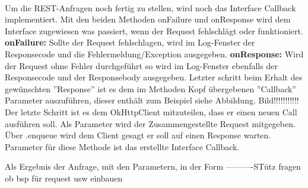 \\
Um die REST-Anfragen noch fertig zu stellen, wird noch das Interface Callback implementiert. Mit den beiden Methoden onFailure und onResponse wird dem Interface zugewiesen was passiert, wenn der Request fehlschlägt oder funktioniert. 
\\
\textbf{onFailure:}
Sollte der Request fehlschlagen, wird im Log-Fenster der Responsecode und die Fehlermeldung/Exception ausgegeben. 
\textbf{onResponse:}
Wird der Request ohne Fehler durchgeführt so wird im Log-Fenster ebenfalls der Responsecode und der Responsebody ausgegeben. Letzter schritt beim Erhalt des gewünschten ''Response'' ist es dem im Methoden Kopf übergebenen ''Callback'' Parameter auszuführen, dieser enthält zum Beispiel siehe Abbildung.
Bild!!!!!!!!!!!
\\
Der letzte Schritt ist es dem OkHttpClient mitzuteilen, dass er einen neuen Call ausführen soll. Als Parameter wird der Zusammengestellte Request mitgegeben. Über .enqueue wird dem Client gesagt er soll auf einen Response warten. Parameter für diese Methode ist das erstellte Interface Callback.
\cite{OkHttp3}





Als Ergebnis der Anfrage, mit den Parametern, in der Form
----------STütz fragen ob bsp für request usw einbauen






